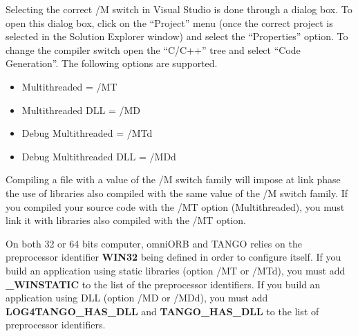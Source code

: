 Selecting the correct /M switch in Visual Studio is done through a
dialog box. To open this dialog box, click on the ``Project'' menu
(once the correct project is selected in the Solution Explorer window)
and select the ``Properties'' option. To change the compiler switch
open the ``C/C++'' tree and select ``Code Generation''. The following
options are supported.
\begin{itemize}
\item Multithreaded = /MT
\item Multithreaded DLL = /MD
\item Debug Multithreaded = /MTd
\item Debug Multithreaded DLL = /MDd
\end{itemize}
Compiling a file with a value of the /M switch family will impose
at link phase the use of libraries also compiled with the same value
of the /M switch family. If you compiled your source code with the
/MT option (Multithreaded), you must link it with libraries also compiled
with the /MT option.

On both 32 or 64 bits computer, omniORB and TANGO relies on the preprocessor
identifier \textbf{WIN32} being defined in order to
configure itself. If you build an application using static libraries
(option /MT or /MTd), you must add \textbf{\_WINSTATIC} to the list
of the preprocessor identifiers. If you build an application using
DLL (option /MD or /MDd), you must add \textbf{LOG4TANGO\_HAS\_DLL}
and \textbf{TANGO\_HAS\_DLL} to the list of preprocessor identifiers.

